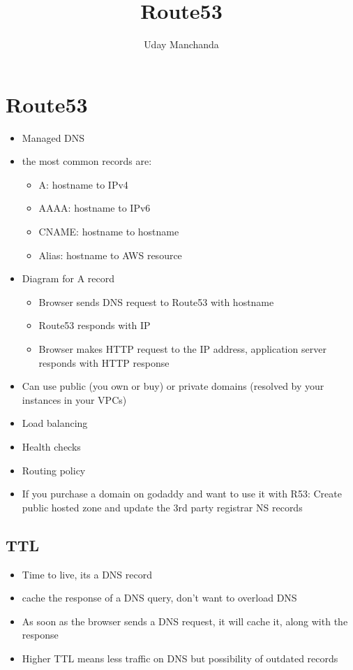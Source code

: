 \documentclass[]{scrartcl}
\title{Route53}
\author{Uday Manchanda}
\begin{document}
\maketitle

\section{Route53}
\begin{itemize}
	\item Managed DNS
	\item the most common records are:
	\begin{itemize}
		\item A: hostname to IPv4
		\item AAAA: hostname to IPv6
		\item CNAME: hostname to hostname
		\item Alias: hostname to AWS resource
	\end{itemize}
	\item Diagram for A record
	\begin{itemize}
		\item Browser sends DNS request to Route53 with hostname
		\item Route53 responds with IP
		\item Browser makes HTTP request to the IP address, application server responds with HTTP response
	\end{itemize}
	\item Can use public (you own or buy) or private domains (resolved by your instances in your VPCs)
	\item Load balancing
	\item Health checks
	\item Routing policy
	\item If you purchase a domain on godaddy and want to use it with R53: Create public hosted zone and update the 3rd party registrar NS records
\end{itemize}

\subsection{TTL}
\begin{itemize}
	\item Time to live, its a DNS record
	\item cache the response of a DNS query, don't want to overload DNS
	\item As soon as the browser sends a DNS request, it will cache it, along with the response
	\item Higher TTL means less traffic on DNS but possibility of outdated records
\end{itemize}
\end{document}
